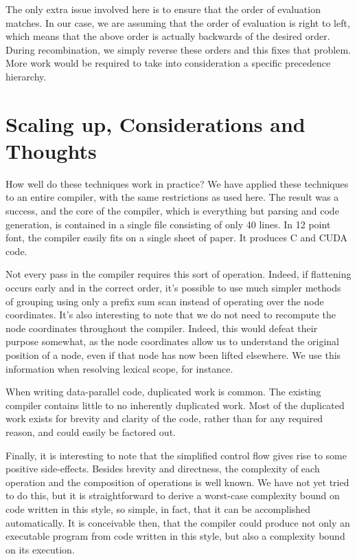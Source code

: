 \documentclass[pldi]{sigplanconf-pldi15}
\begin{document}
The only extra issue involved here is to ensure that the order of evaluation matches. In our case, we 
are assuming that the order of evaluation is right to left, which means that the above order is actually 
backwards of the desired order. During recombination, we simply reverse these orders and this fixes 
that problem. More work would be required to take into consideration a specific precedence hierarchy. 
\section{Scaling up, Considerations and Thoughts}

How well do these techniques work in practice? We have applied these techniques to an entire compiler, 
with the same restrictions as used here. The result was a success, and the core of the compiler, which 
is everything but parsing and code generation, is contained in a single file consisting of only 40 lines. 
In 12 point font, the compiler easily fits on a single sheet of paper. It produces C and CUDA code.

Not every pass in the compiler requires this sort of operation. Indeed, if flattening occurs early and 
in the correct order, it’s possible to use much simpler methods of grouping using only a prefix sum 
scan instead of operating over the node coordinates. It’s also interesting to note that we do not 
need to recompute the node coordinates throughout the compiler. Indeed, this would defeat their 
purpose somewhat, as the node coordinates allow us to understand the original position of a node, 
even if that node has now been lifted elsewhere. We use this information when resolving lexical scope, 
for instance. 

When writing data-parallel code, duplicated work is common. The existing compiler contains little to 
no inherently duplicated work. Most of the duplicated work exists for brevity and clarity of the code, 
rather than for any required reason, and could easily be factored out. 

Finally, it is interesting to note that the simplified control flow gives rise to some positive side-effects. 
Besides brevity and directness, the complexity of each operation and the composition of operations is 
well known. We have not yet tried to do this, but it is straightforward to derive a worst-case complexity 
bound on code written in this style, so simple, in fact, that it can be accomplished automatically. It is 
conceivable then, that the compiler could produce not only an executable program from code written 
in this style, but also a complexity bound on its execution. 
\end{document}
